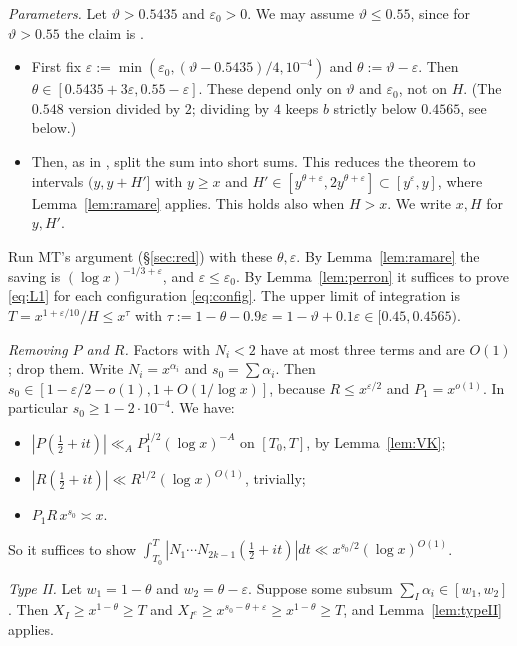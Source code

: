 \documentclass[11pt]{amsart}
\theoremstyle{definition}
\theoremstyle{remark}
\newcommand{\e}{\varepsilon}
\begin{document}
\emph{Parameters.} Let $\vartheta>0.5435$ and $\e_0>0$. We may assume $\vartheta\le0.55$, since for $\vartheta>0.55$ the claim is
\cite[Theorem~1.1]{MT}.
\begin{itemize}[leftmargin=*]
\item First fix $\e:=\min(\e_0,(\vartheta-0.5435)/4,10^{-4})$ and $\theta:=\vartheta-\e$. Then $\theta\in[0.5435+3\e,0.55-\e]$. These depend only on
$\vartheta$ and $\e_0$, not on $H$. (The $0.548$ version divided by $2$; dividing by $4$ keeps $b$ strictly below $0.4565$, see below.)
\item Then, as in \cite[\S4.1]{MT}, split the sum into short sums. This reduces the theorem to intervals $(y,y+H']$ with $y\ge x$ and
$H'\in[y^{\theta+\e},2y^{\theta+\e}]\subset[y^{\e},y]$, where Lemma~\ref{lem:ramare} applies. This holds also when $H>x$. We write $x,H$ for $y,H'$.
\end{itemize} Run MT's argument (\S\ref{sec:red}) with these $\theta,\e$. By Lemma~\ref{lem:ramare} the saving is $(\log x)^{-1/3+\e}$, and
$\e\le\e_0$. By Lemma~\ref{lem:perron} it suffices to prove \eqref{eq:L1} for each configuration \eqref{eq:config}. The upper limit of
integration is $T=x^{1+\e/10}/H\le x^{\tau}$ with $\tau:=1-\theta-0.9\e=1-\vartheta+0.1\e\in[0.45,0.4565)$.

\emph{Removing $P$ and $R$.} Factors with $N_i<2$ have at most three terms and are $O(1)$; drop them. Write $N_i=x^{\alpha_i}$ and $s_0=\sum\alpha_i$. Then
$s_0\in[1-\e/2-o(1),1+O(1/\log x)]$, because $R\le x^{\e/2}$ and $P_1=x^{o(1)}$. In particular $s_0\ge1-2\cdot10^{-4}$. We have:
\begin{itemize}[leftmargin=*]
\item $|P(\frac12+it)|\ll_AP_1^{1/2}(\log x)^{-A}$ on $[T_0,T]$, by Lemma~\ref{lem:VK};
\item $|R(\frac12+it)|\ll R^{1/2}(\log x)^{O(1)}$, trivially;
\item $P_1R\,x^{s_0}\asymp x$.
\end{itemize}
So it suffices to show $\int_{T_0}^T|N_1\cdots N_{2k-1}(\frac12+it)|dt\ll x^{s_0/2}(\log x)^{O(1)}$.

\emph{Type II.} Let $w_1=1-\theta$ and $w_2=\theta-\e$. Suppose some subsum $\sum_I\alpha_i\in[w_1,w_2]$. Then $X_I\ge x^{1-\theta}\ge T$ and
$X_{I^c}\ge x^{s_0-\theta+\e}\ge x^{1-\theta}\ge T$, and Lemma~\ref{lem:typeII} applies.
\end{document}
